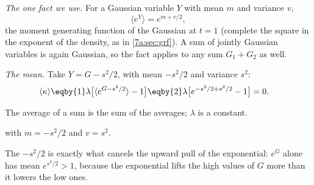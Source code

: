 \emph{The one fact we use.} For a Gaussian variable $Y$ with mean $m$ and variance $v$,
\begin{equation}
\langle e^{Y}\rangle=e^{m+v/2},
\label{12w:eq:mgf}
\end{equation}
the moment generating function of the Gaussian at $t=1$ (complete the square in the exponent of the density, as
in \cref{7a:sec:grf}). A sum of jointly Gaussian variables is again Gaussian, so the fact applies to any sum
$G_1+G_2$ as well.

\emph{The mean.} Take $Y=G-s^2/2$, with mean $-s^2/2$ and variance $s^2$:
\begin{align}
\langle\kappa\rangle
&\eqby{1}\lambda\bigl[\langle e^{G-s^2/2}\rangle-1\bigr]
\eqby{2}\lambda\bigl[e^{-s^2/2+s^2/2}-1\bigr]=0 .
\label{12w:eq:ln-mean}
\end{align}
\begin{explain}
  \item The average of a sum is the sum of the averages; $\lambda$ is a constant.
  \item {} with $m=-s^2/2$ and $v=s^2$.
\end{explain}
The $-s^2/2$ is exactly what cancels the upward pull of the exponential: $e^G$ alone has mean $e^{s^2/2}>1$,
because the exponential lifts the high values of $G$ more than it lowers the low ones.

